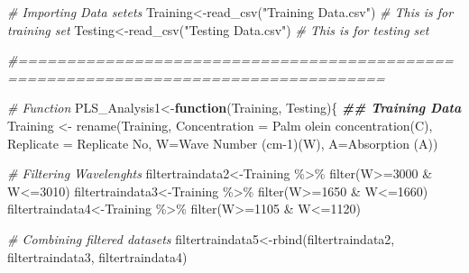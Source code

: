 \documentclass[
]{article}
\newenvironment{Shaded}{\begin{snugshade}}{\end{snugshade}}
\newcommand{\AttributeTok}[1]{\textcolor[rgb]{0.77,0.63,0.00}{#1}}
\newcommand{\CommentTok}[1]{\textcolor[rgb]{0.56,0.35,0.01}{\textit{#1}}}
\newcommand{\ControlFlowTok}[1]{\textcolor[rgb]{0.13,0.29,0.53}{\textbf{#1}}}
\newcommand{\DecValTok}[1]{\textcolor[rgb]{0.00,0.00,0.81}{#1}}
\newcommand{\DocumentationTok}[1]{\textcolor[rgb]{0.56,0.35,0.01}{\textbf{\textit{#1}}}}
\newcommand{\FunctionTok}[1]{\textcolor[rgb]{0.00,0.00,0.00}{#1}}
\newcommand{\NormalTok}[1]{#1}
\newcommand{\OtherTok}[1]{\textcolor[rgb]{0.56,0.35,0.01}{#1}}
\newcommand{\SpecialCharTok}[1]{\textcolor[rgb]{0.00,0.00,0.00}{#1}}
\newcommand{\StringTok}[1]{\textcolor[rgb]{0.31,0.60,0.02}{#1}}
\begin{document}
\begin{Shaded}
\begin{Highlighting}[]
\CommentTok{\# Importing Data setets}
\NormalTok{Training}\OtherTok{\textless{}{-}}\FunctionTok{read\_csv}\NormalTok{(}\StringTok{"Training Data.csv"}\NormalTok{) }\CommentTok{\# This is for training set}
\NormalTok{Testing}\OtherTok{\textless{}{-}}\FunctionTok{read\_csv}\NormalTok{(}\StringTok{"Testing Data.csv"}\NormalTok{) }\CommentTok{\# This is for testing set}

\CommentTok{\#====================================================================================}

\CommentTok{\# Function }
\NormalTok{PLS\_Analysis1}\OtherTok{\textless{}{-}}\ControlFlowTok{function}\NormalTok{(Training, Testing)\{}
  \DocumentationTok{\#\# Training Data }
\NormalTok{  Training }\OtherTok{\textless{}{-}} \FunctionTok{rename}\NormalTok{(Training, }\AttributeTok{Concentration =} \StringTok{\textasciigrave{}}\AttributeTok{Palm olein concentration(C)}\StringTok{\textasciigrave{}}\NormalTok{, }
                     \AttributeTok{Replicate =} \StringTok{\textasciigrave{}}\AttributeTok{Replicate No}\StringTok{\textasciigrave{}}\NormalTok{, }\AttributeTok{W=}\StringTok{\textasciigrave{}}\AttributeTok{Wave Number (cm{-}1)(W)}\StringTok{\textasciigrave{}}\NormalTok{, }\AttributeTok{A=}\StringTok{\textasciigrave{}}\AttributeTok{Absorption (A)}\StringTok{\textasciigrave{}}\NormalTok{)}
  
  \CommentTok{\# Filtering Wavelenghts}
\NormalTok{  filtertraindata2}\OtherTok{\textless{}{-}}\NormalTok{Training }\SpecialCharTok{\%\textgreater{}\%} \FunctionTok{filter}\NormalTok{(W}\SpecialCharTok{\textgreater{}=}\DecValTok{3000} \SpecialCharTok{\&}\NormalTok{ W}\SpecialCharTok{\textless{}=}\DecValTok{3010}\NormalTok{)}
\NormalTok{  filtertraindata3}\OtherTok{\textless{}{-}}\NormalTok{Training }\SpecialCharTok{\%\textgreater{}\%} \FunctionTok{filter}\NormalTok{(W}\SpecialCharTok{\textgreater{}=}\DecValTok{1650} \SpecialCharTok{\&}\NormalTok{ W}\SpecialCharTok{\textless{}=}\DecValTok{1660}\NormalTok{)}
\NormalTok{  filtertraindata4}\OtherTok{\textless{}{-}}\NormalTok{Training }\SpecialCharTok{\%\textgreater{}\%} \FunctionTok{filter}\NormalTok{(W}\SpecialCharTok{\textgreater{}=}\DecValTok{1105} \SpecialCharTok{\&}\NormalTok{ W}\SpecialCharTok{\textless{}=}\DecValTok{1120}\NormalTok{)}
  
  \CommentTok{\# Combining filtered datasets}
\NormalTok{  filtertraindata5}\OtherTok{\textless{}{-}}\FunctionTok{rbind}\NormalTok{(filtertraindata2, filtertraindata3, filtertraindata4) }
  

\end{Highlighting}
\end{Shaded}
\end{document}
